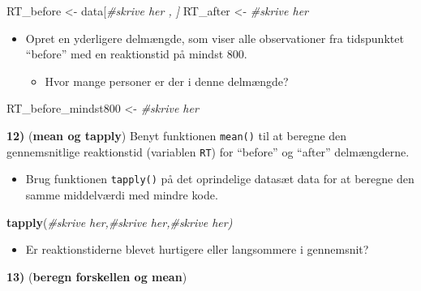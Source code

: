 \documentclass[
]{book}
\newenvironment{Shaded}{\begin{snugshade}}{\end{snugshade}}
\newcommand{\CommentTok}[1]{\textcolor[rgb]{0.56,0.35,0.01}{\textit{#1}}}
\newcommand{\FunctionTok}[1]{\textcolor[rgb]{0.13,0.29,0.53}{\textbf{#1}}}
\newcommand{\NormalTok}[1]{#1}
\newcommand{\OtherTok}[1]{\textcolor[rgb]{0.56,0.35,0.01}{#1}}
\providecommand{\tightlist}{%
  \setlength{\itemsep}{0pt}\setlength{\parskip}{0pt}}
\theoremstyle{definition}
\theoremstyle{definition}
\theoremstyle{definition}
\theoremstyle{definition}
\theoremstyle{remark}
\begin{document}
\begin{Shaded}
\begin{Highlighting}[]
\NormalTok{RT\_before }\OtherTok{\textless{}{-}}\NormalTok{ data[}\CommentTok{\#skrive her , ]}
\NormalTok{RT\_after }\OtherTok{\textless{}{-}} \CommentTok{\#skrive her}
\end{Highlighting}
\end{Shaded}

\begin{itemize}
\tightlist
\item
  Opret en yderligere delmængde, som viser alle observationer fra tidspunktet ``before'' med en reaktionstid på mindst 800.

  \begin{itemize}
  \tightlist
  \item
    Hvor mange personer er der i denne delmængde?
  \end{itemize}
\end{itemize}

\begin{Shaded}
\begin{Highlighting}[]
\NormalTok{RT\_before\_mindst800 }\OtherTok{\textless{}{-}} \CommentTok{\#skrive her}
\end{Highlighting}
\end{Shaded}

\textbf{12)} (\textbf{mean og tapply}) Benyt funktionen \texttt{mean()} til at beregne den gennemsnitlige reaktionstid (variablen \texttt{RT}) for ``before'' og ``after'' delmængderne.

\begin{itemize}
\tightlist
\item
  Brug funktionen \texttt{tapply()} på det oprindelige datasæt data for at beregne den samme middelværdi med mindre kode.
\end{itemize}

\begin{Shaded}
\begin{Highlighting}[]
\FunctionTok{tapply}\NormalTok{(}\CommentTok{\#skrive her,\#skrive her,\#skrive her)}
\end{Highlighting}
\end{Shaded}

\begin{itemize}
\tightlist
\item
  Er reaktionstiderne blevet hurtigere eller langsommere i gennemsnit?
\end{itemize}

\textbf{13)} (\textbf{beregn forskellen og mean})
\end{document}
